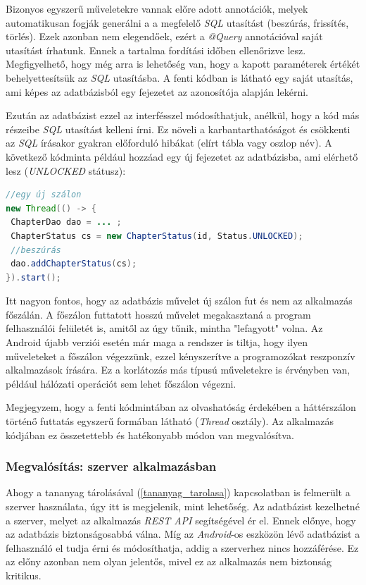 \documentclass[12pt,a4paper]{article}
\begin{document}
	Bizonyos egyszerű műveletekre vannak előre adott annotációk, melyek automatikusan fogják generálni a a megfelelő \textit{SQL} utasítást (beszúrás, frissítés, törlés). Ezek azonban nem elegendőek, ezért a \textit{@Query} annotációval saját utasítást írhatunk. Ennek a tartalma fordítási időben ellenőrizve lesz. Megfigyelhető, hogy még arra is lehetőség van, hogy a kapott paraméterek értékét behelyettesítsük az \textit{SQL} utasításba. A fenti kódban is látható egy saját utasítás, ami képes az adatbázisból egy fejezetet az azonosítója alapján lekérni.

	Ezután az adatbázist ezzel az interfésszel módosíthatjuk, anélkül, hogy a kód más részeibe \textit{SQL} utasítást kelleni írni. Ez növeli a karbantarthatóságot és 
	csökkenti az \textit{SQL} írásakor gyakran előforduló hibákat (elírt tábla vagy oszlop név). A következő kódminta például hozzáad egy új fejezetet az adatbázisba, ami elérhető lesz (\textit{UNLOCKED} státusz):
	
	\begin{lstlisting}[language=Java]
//egy új szálon
new Thread(() -> {
 ChapterDao dao = ... ;
 ChapterStatus cs = new ChapterStatus(id, Status.UNLOCKED);
 //beszúrás
 dao.addChapterStatus(cs);
}).start();
	\end{lstlisting}
	
	Itt nagyon fontos, hogy az adatbázis művelet új szálon fut és nem az alkalmazás főszálán. A főszálon futtatott hosszú művelet megakasztaná a program felhasználói felületét is, amitől az úgy tűnik, mintha "lefagyott" volna. Az Android újabb verziói esetén már maga a rendszer is tiltja, hogy ilyen műveleteket 
	a főszálon végezzünk, ezzel kényszerítve a programozókat reszponzív alkalmazások írására. Ez a korlátozás más típusú műveletekre is érvényben van, például hálózati operációt sem lehet főszálon végezni.
	
	Megjegyzem, hogy a fenti kódmintában az olvashatóság érdekében a háttérszálon történő futtatás egyszerű formában látható (\textit{Thread} osztály). Az alkalmazás kódjában ez összetettebb és hatékonyabb módon van megvalósítva. 
	
	\subsubsection{Megvalósítás: szerver alkalmazásban}
	
	Ahogy a tananyag tárolásával (\ref{tananyag_tarolasa}) kapcsolatban is felmerült a szerver használata, úgy itt is megjelenik, mint lehetőség. Az adatbázist kezelhetné a szerver, melyet az alkalmazás \textit{REST API} segítségével ér el. Ennek előnye, hogy az adatbázis biztonságosabbá válna. Míg az \textit{Android}-os eszközön lévő adatbázist a felhasználó el tudja érni és módosíthatja, addig a szerverhez nincs hozzáférése. Ez az előny azonban nem olyan jelentős, mivel ez az alkalmazás nem biztonság kritikus. 
	
\end{document}
